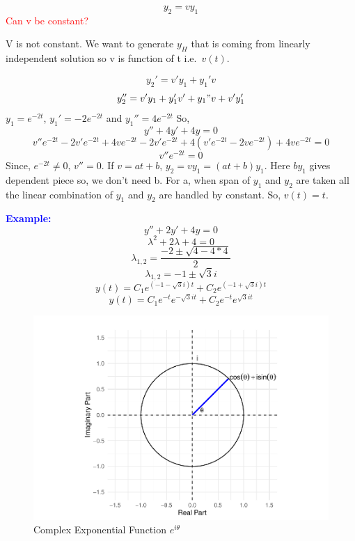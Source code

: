 \documentclass[
  11pt,
]{article}
\begin{document}
\[y_2=vy_1 \tag{1}\] \textcolor{red}{Can v be constant?}

V is not constant. We want to generate \(y_H\) that is coming from
linearly independent solution so v is function of t i.e.~\(v(t)\).

\[y_2'=v'y_1+y_1'v\] \[y_2''=v'y_1+y_1'v'+y_1"v+v'y_1'\]
\(y_1=e^{-2t}\), \(y_1'=-2e^{-2t}\) and \(y_1''=4e^{-2t}\) So,
\[y''+4y'+4y=0\]
\[v''e^{-2t}-2v'e^{-2t}+4ve^{-2t}-2v'e^{-2t}+4(v'e^{-2t}-2ve^{-2t})+4ve^{-2t}=0\]
\[v''e^{-2t}=0\] Since, \(e^{-2t} \neq 0\), \(v''=0\). If \(v = at+b\),
\(y_2=vy_1 =(at+b)y_1\). Here \(by_1\) gives dependent piece so, we
don't need b. For a, when span of \(y_1\) and \(y_2\) are taken all the
linear combination of \(y_1\) and \(y_2\) are handled by constant. So,
\(v(t) = t\).

\textbf{\textcolor{blue}{Example:}} \[y''+2y'+4y=0\]
\[\lambda^2+2 \lambda + 4 = 0\]
\[\lambda_{1,2} = \frac{-2 \pm \sqrt{4-4*4}}{2}\]
\[\lambda_{1,2}=-1 \pm \sqrt{3}i\]
\[y(t)=C_1e^{(-1 - \sqrt{3}i)t}+C_2e^{(-1 + \sqrt{3}i)t}\]
\[y(t)=C_1e^{-t}e^{- \sqrt{3}it}+C_2e^{-t}e^{\sqrt{3}it}\]

\begin{figure}
\centering
\includegraphics{differential_files/figure-latex/difference6-1.pdf}
\caption{Complex Exponential Function \(e^{iθ}\)}
\end{figure}
\end{document}
